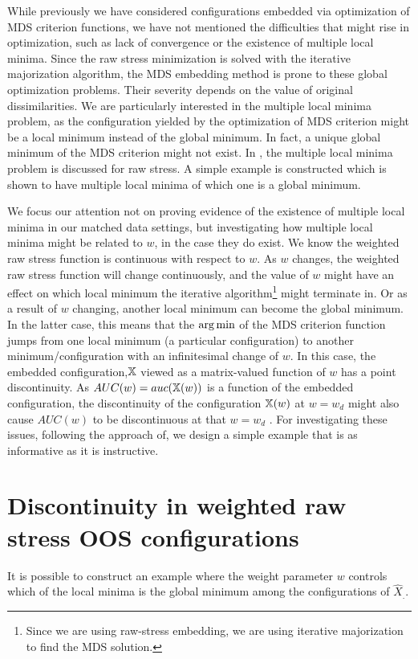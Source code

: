 \documentclass[12pt,oneside,final]{thesis}
\begin{document}
While previously we have considered  configurations embedded via optimization of  MDS criterion functions,   we have not mentioned  the difficulties that might rise in optimization, such as lack of convergence or the existence  of  multiple local minima. Since the raw stress minimization is solved with the iterative majorization algorithm, the MDS embedding method is prone to these global optimization problems. Their severity depends on the value of  original dissimilarities. We are particularly interested in the multiple local minima problem, as the configuration yielded by the  optimization of MDS criterion might be  a local minimum instead of the global minimum. In fact, a unique global minimum of the MDS criterion might not exist. In \cite{TrossetLocalMin}, the multiple local minima problem is discussed for raw stress. A simple example is constructed which is shown to have multiple local minima of which one is a global minimum.


We focus our attention not  on proving  evidence of the existence of multiple local minima  in our matched data settings, but investigating how multiple local minima might be related to $w$, in the case they do exist. We know the weighted raw stress function is continuous with respect to $w$. As $w$ changes, the weighted raw stress function will change continuously, and the value of $w$ might have an  effect on  which local minimum  the iterative algorithm\footnote{Since we are using raw-stress embedding, we are using iterative majorization to find the MDS solution.} might terminate in. Or as a result of $w$ changing,  another local minimum can become the global minimum. In the latter case, this means that the $\arg\min$ of the MDS criterion function jumps from one local minimum (a particular configuration) to another minimum/configuration with an infinitesimal change of $w$. In this case, the embedded configuration,$\mathbb{X}$ viewed as a matrix-valued function of $w$ has a point discontinuity. As $AUC(w)=auc(\mathbb{X} (w))$ is a function of the embedded configuration, the discontinuity of the configuration $\mathbb{X}(w)$ at $w= w_{d}$ might also cause $AUC(w)$ to be discontinuous at that $w=w_{d}$ .   For investigating these issues, following the approach of\cite{TrossetLocalMin}, we design a simple example that is as informative as it is instructive.  

\section{ Discontinuity in weighted raw stress OOS configurations\label{subsubsec:Discontinuity}}
 It is  possible to construct an example  where the weight parameter $w$ controls which of the local minima is the global minimum among the configurations of $\hat{X}_{.}$.
\end{document}
